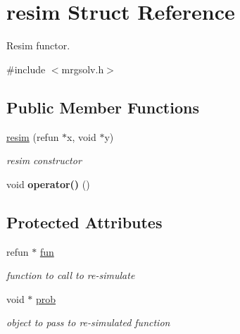 \hypertarget{structresim}{}\section{resim Struct Reference}
\label{structresim}


Resim functor.  




{\ttfamily \#include $<$mrgsolv.\+h$>$}

\subsection*{Public Member Functions}
\begin{DoxyCompactItemize}
\item 
\mbox{\label{structresim_a8776836c59a5748e28d68d795569064b}} 
\hyperlink{structresim_a8776836c59a5748e28d68d795569064b}{resim} (refun $\ast$x, void $\ast$y)
\begin{DoxyCompactList}\small\item\em resim constructor \end{DoxyCompactList}\item 
\mbox{\label{structresim_a66f6218d872d52eab1b2f7560f2c1b72}} 
void {\bfseries operator()} ()
\end{DoxyCompactItemize}
\subsection*{Protected Attributes}
\begin{DoxyCompactItemize}
\item 
\mbox{\label{structresim_a34ecef977366860be72ee4c1a8ee2ba6}} 
refun $\ast$ \hyperlink{structresim_a34ecef977366860be72ee4c1a8ee2ba6}{fun}
\begin{DoxyCompactList}\small\item\em function to call to re-\/simulate \end{DoxyCompactList}\item 
\mbox{\label{structresim_a85a513d872c25a973fafa56d4453c4e9}} 
void $\ast$ \hyperlink{structresim_a85a513d872c25a973fafa56d4453c4e9}{prob}
\begin{DoxyCompactList}\small\item\em object to pass to re-\/simulated function \end{DoxyCompactList}\end{DoxyCompactItemize}


